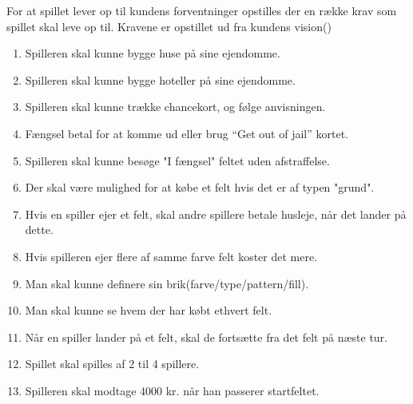 For at spillet lever op til kundens forventninger opstilles der en række krav som spillet skal leve op til. Kravene er opstillet ud fra kundens vision(\cite{nyborg_cdio_nodate})


\begin{enumerate}
\item Spilleren skal kunne bygge huse på sine ejendomme. \label{kr:RQ01}
\item Spilleren skal kunne bygge hoteller på sine ejendomme.  \label{kr:RQ02}
\item Spilleren skal kunne trække chancekort, og følge anvisningen. \label{kr:RQ03}
\item Fængsel betal for at komme ud eller brug “Get out of jail” kortet. \label{kr:RQ04}
\item Spilleren skal kunne besøge "I fængsel" feltet uden afstraffelse. \label{kr:RQ05}
\item Der skal være mulighed for at købe et felt hvis det er af typen "grund". \label{kr:RQ06}
\item Hvis en spiller ejer et felt, skal andre spillere betale husleje, når det lander på dette. \label{kr:RQ07}
\item Hvis spilleren ejer flere af samme farve felt koster det mere. \label{kr:RQ08}
\item Man skal kunne definere sin brik(farve/type/pattern/fill). \label{kr:RQ09}
\item Man skal kunne se hvem der har købt ethvert felt. \label{kr:RQ10}
\item Når en spiller lander på et felt, skal de fortsætte fra det felt på næste tur. \label{kr:RQ11}
\item Spillet skal spilles af 2 til 4 spillere. \label{kr:RQ12}
\item Spilleren skal modtage 4000 kr. når han passerer startfeltet. \label{kr:RQ13}
\end{enumerate}